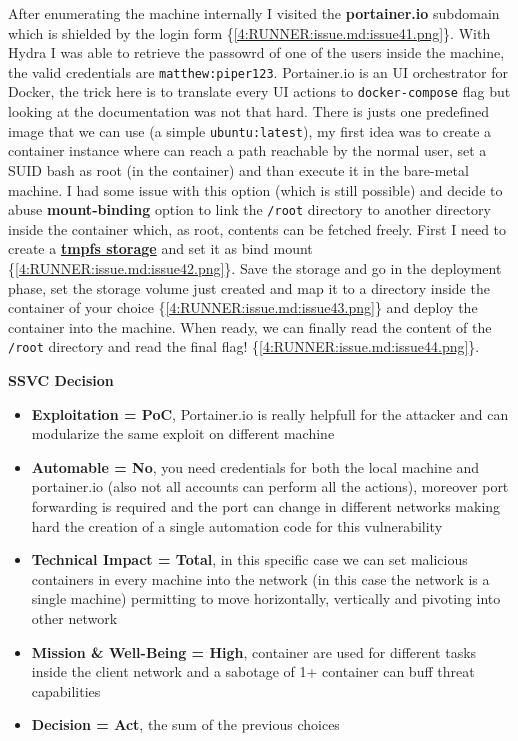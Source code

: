 \documentclass[a4paper]{article}
\newcommand{\passthrough}[1]{\colorbox{code}{\lstset{mathescape=false}#1}}
\def\tightlist{}
\begin{document}
      After enumerating the machine internally I visited the \textbf{portainer.io} subdomain which is shielded by the login form \{\ref{4:RUNNER:issue.md:issue41.png}\}. With Hydra I was able to retrieve the
passowrd of one of the users inside the machine, the valid credentials are \passthrough{\lstinline!matthew:piper123!}. Portainer.io is an UI orchestrator for Docker, the trick here is to translate every UI actions to
\passthrough{\lstinline!docker-compose!} flag but looking at the documentation was not that hard. There is justs one predefined image that we can use (a simple \passthrough{\lstinline!ubuntu:latest!}), my first idea was to create a container instance
where can reach a path reachable by the normal user, set a SUID bash as root (in the container) and than execute it in the bare-metal machine. I had some issue with this option (which is still possible) and
decide to abuse \textbf{mount-binding} option to link the \passthrough{\lstinline!/root!} directory to another directory inside the container which, as root, contents can be fetched freely. First I need to create a \href{https://docs.portainer.io/user/docker/volumes/add\#adding-a-tmpfs-volume}{\textbf{tmpfs storage}}
and set it as bind mount \{\ref{4:RUNNER:issue.md:issue42.png}\}. Save the storage and go in the deployment phase, set the storage volume just created and map it to a directory inside the container of your choice \{\ref{4:RUNNER:issue.md:issue43.png}\} and deploy the container
into the machine. When ready, we can finally read the content of the \passthrough{\lstinline!/root!} directory and read the final flag! \{\ref{4:RUNNER:issue.md:issue44.png}\}.

\textbf{SSVC Decision}

\begin{itemize}
\tightlist
\item
  \textbf{Exploitation = PoC}, Portainer.io is really helpfull for the attacker and can modularize the same exploit on different machine
\item
  \textbf{Automable = No}, you need credentials for both the local machine and portainer.io (also not all accounts can perform all the actions), moreover port forwarding is required and the port can change in different networks making hard the creation of a single automation code for this vulnerability
\item
  \textbf{Technical Impact = Total}, in this specific case we can set malicious containers in every machine into the network (in this case the network is a single machine) permitting to move horizontally, vertically and pivoting into other network
\item
  \textbf{Mission \& Well-Being = High}, container are used for different tasks inside the client network and a sabotage of 1+ container can buff threat capabilities
\item
  \textbf{Decision = Act}, the sum of the previous choices
\end{itemize}
\end{document}
